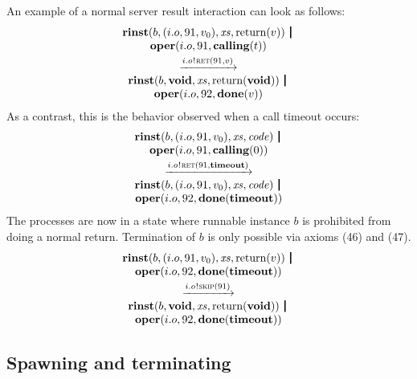 \documentclass[10pt,conference]{IEEEtran}
\begin{document}
An example of a normal server result interaction can look as follows:
$$
\begin{array}{c}
  {\Trinst b {\Tclient {i.o} {91} {v_0}} \Xs {\Treturn v}} \,\Opar  \\
  {\Toper {i.o} {91} {\Tcalling t}} \vspace{0.6ex} \\
  \red{\say{i.o}{\Tret {91} v}} \\
  {\Trinst b \Tvoid \Xs {\Treturn \Tvoid}} \,\Opar \\
  {\Toper {i.o} {92} {\Tdone v}}
\end{array}
$$
As a contrast, this is the behavior observed when a call timeout occurs:
$$
\begin{array}{c}
  {\Trinst b {\Tclient {i.o} {91} {v_0}} \Xs \Code} \,\Opar  \\
  {\Toper {i.o} {91} {\Tcalling 0}} \vspace{0.6ex} \\
  \red{\say{i.o}{\Tret {91} \Ttimeout}} \\
  {\Trinst b {\Tclient {i.o} {91} {v_0}} \Xs \Code} \,\Opar  \\
  {\Toper {i.o} {92} {\Tdone \Ttimeout}}
\end{array}
$$
The processes are now in a state where runnable instance $b$ is prohibited from doing a normal return. Termination of $b$ is only possible via axioms (46) and (47).
$$
\begin{array}{c}
  {\Trinst b {\Tclient {i.o} {91} {v_0}} \Xs {\Treturn v}} \,\Opar  \\
  {\Toper {i.o} {92} {\Tdone \Ttimeout}} \vspace{0.6ex} \\
  \red{\say{i.o}{\Tskip {91}}} \\
  {\Trinst b \Tvoid \Xs {\Treturn \Tvoid}} \,\Opar \\
  {\Toper {i.o} {92} {\Tdone \Ttimeout}}
\end{array}
$$


\subsection{Spawning and terminating} \label{sect:SpawnTerm}
\end{document}
